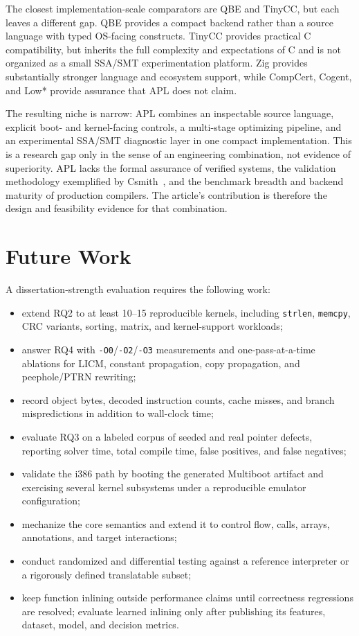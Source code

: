 \documentclass[10pt,twocolumn]{article}
\begin{document}
\par The closest implementation-scale comparators are QBE and TinyCC, but each leaves a different gap. QBE provides a compact backend rather than a source language with typed OS-facing constructs. TinyCC provides practical C compatibility, but inherits the full complexity and expectations of C and is not organized as a small SSA/SMT experimentation platform. Zig provides substantially stronger language and ecosystem support, while CompCert, Cogent, and Low* provide assurance that APL does not claim.

\par The resulting niche is narrow: APL combines an inspectable source language, explicit boot- and kernel-facing controls, a multi-stage optimizing pipeline, and an experimental SSA/SMT diagnostic layer in one compact implementation. This is a research gap only in the sense of an engineering combination, not evidence of superiority. APL lacks the formal assurance of verified systems, the validation methodology exemplified by Csmith~\cite{yang2011csmith}, and the benchmark breadth and backend maturity of production compilers. The article's contribution is therefore the design and feasibility evidence for that combination.

\section{Future Work}

\par A dissertation-strength evaluation requires the following work:
\begin{itemize}[leftmargin=*]
  \item extend RQ2 to at least 10--15 reproducible kernels, including \texttt{strlen}, \texttt{memcpy}, CRC variants, sorting, matrix, and kernel-support workloads;
  \item answer RQ4 with \texttt{-O0}/\texttt{-O2}/\texttt{-O3} measurements and one-pass-at-a-time ablations for LICM, constant propagation, copy propagation, and peephole/PTRN rewriting;
  \item record object bytes, decoded instruction counts, cache misses, and branch mispredictions in addition to wall-clock time;
  \item evaluate RQ3 on a labeled corpus of seeded and real pointer defects, reporting solver time, total compile time, false positives, and false negatives;
  \item validate the i386 path by booting the generated Multiboot artifact and exercising several kernel subsystems under a reproducible emulator configuration;
  \item mechanize the core semantics and extend it to control flow, calls, arrays, annotations, and target interactions;
  \item conduct randomized and differential testing against a reference interpreter or a rigorously defined translatable subset;
  \item keep function inlining outside performance claims until correctness regressions are resolved; evaluate learned inlining only after publishing its features, dataset, model, and decision metrics.
\end{itemize}
\end{document}
